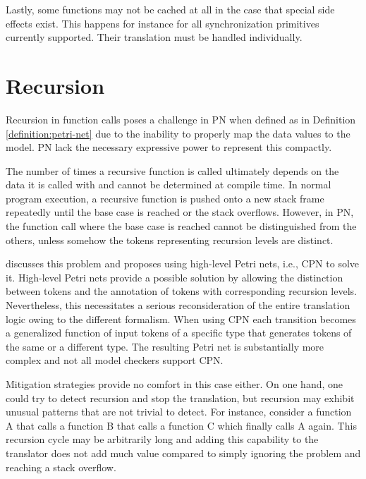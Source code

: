 Lastly, some functions may not be cached at all in the case that special side effects exist.
This happens for instance for all synchronization primitives currently supported.
Their translation must be handled individually.

\section{Recursion}
\label{sec:future-work-recursion}

Recursion in function calls poses a challenge in \acrshort{PN}
when defined as in Definition \ref{definition:petri-net} due to the inability
to properly map the data values to the model.
\acrshort{PN} lack the necessary expressive power to represent this compactly.

The number of times a recursive function is called ultimately depends
on the data it is called with and cannot be determined at compile time.
In normal program execution,
a recursive function is pushed onto a new stack frame repeatedly
until the base case is reached or the stack overflows.
However, in \acrshort{PN}, the function call where the base case is reached
cannot be distinguished from the others,
unless somehow the tokens representing recursion levels are distinct.

\cite[Sec. 3.4.2]{meyer2020} discusses this problem
and proposes using high-level Petri nets, i.e., \acrfull{CPN} to solve it.
High-level Petri nets provide a possible solution by allowing the distinction
between tokens and the annotation of tokens with corresponding recursion levels.
Nevertheless, this necessitates a serious reconsideration of the entire translation logic
owing to the different formalism.
When using \acrshort{CPN} each transition becomes a generalized function of
input tokens of a specific type that generates tokens of the same or a different type.
The resulting Petri net is substantially more complex
and not all model checkers support \acrshort{CPN}.

Mitigation strategies provide no comfort in this case either.
On one hand, one could try to detect recursion and stop the translation,
but recursion may exhibit unusual patterns that are not trivial to detect.
For instance, consider a function A that calls a function B
that calls a function C which finally calls A again.
This recursion cycle may be arbitrarily long
and adding this capability to the translator
does not add much value compared to
simply ignoring the problem and reaching a stack overflow.

